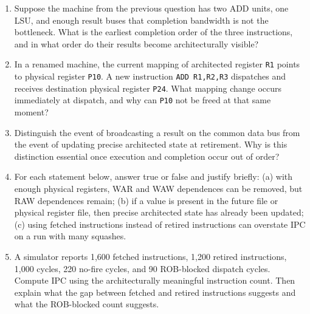 \begin{enumerate}
    For each entry, identify the destination tag or physical register, which source operands are already ready, and which operands are waiting on older tags.
    \item Suppose the machine from the previous question has two ADD units, one LSU, and enough result buses that completion bandwidth is not the bottleneck.
    What is the earliest completion order of the three instructions, and in what order do their results become architecturally visible?
    \item In a renamed machine, the current mapping of architected register \texttt{R1} points to physical register \texttt{P10}.
    A new instruction \texttt{ADD R1,R2,R3} dispatches and receives destination physical register \texttt{P24}.
    What mapping change occurs immediately at dispatch, and why can \texttt{P10} not be freed at that same moment?
    \item Distinguish the event of broadcasting a result on the common data bus from the event of updating precise architected state at retirement.
    Why is this distinction essential once execution and completion occur out of order?
    \item For each statement below, answer true or false and justify briefly: (a) with enough physical registers, WAR and WAW dependences can be removed, but RAW dependences remain; (b) if a value is present in the future file or physical register file, then precise architected state has already been updated; (c) using fetched instructions instead of retired instructions can overstate IPC on a run with many squashes.
    \item A simulator reports 1{,}600 fetched instructions, 1{,}200 retired instructions, 1{,}000 cycles, 220 no-fire cycles, and 90 ROB-blocked dispatch cycles.
    Compute IPC using the architecturally meaningful instruction count.
    Then explain what the gap between fetched and retired instructions suggests and what the ROB-blocked count suggests.
\end{enumerate}




